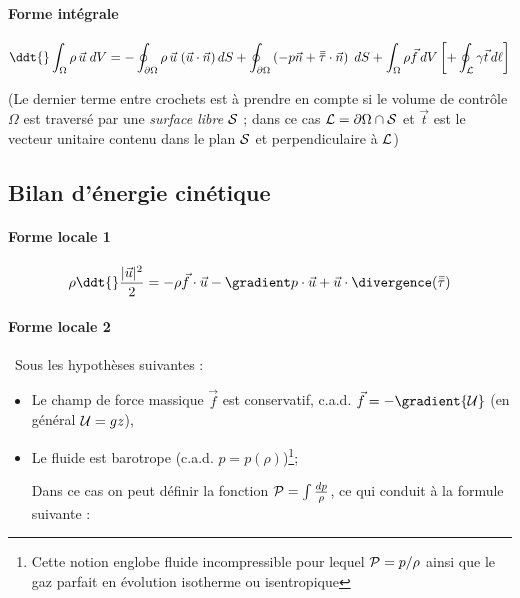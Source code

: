 \paragraph{Forme intégrale}
	\begin{equation}
		\ddt{} \int_{\Omega} \rho \, \vec{u} \; dV 
		=
		- \oint_{\partial \Omega} \rho \, \vec{u}\; (\vec{u}\cdot \vec{n}) \, dS
		+ \oint_{\partial \Omega} \left( -p \vec{n} + \mytensor{\tau} \cdot \vec{n}\right) \; dS
		+ \int_{\Omega} \rho \vec{f} \, dV 
		\left[ + \oint_{\cal L} \gamma \vec{t}  \, d\ell \right]
		\label{eq:bilan_global_eulerien_qdm}
	\end{equation}
	
{\small (Le dernier terme entre crochets est à prendre en compte si le volume de contrôle $\Omega$ est traversé par une {\em surface libre} ${\cal S}$ ; dans ce cas  $ {\cal L} = {\partial \Omega} \cap \cal S$ et $\vec t$ est le vecteur unitaire contenu dans le plan ${\cal S}$ et perpendiculaire à ${\cal L}$)}

\subsection{Bilan d'énergie cinétique}


\paragraph{Forme locale 1}
\begin{equation}
		\rho \ddt{} \frac{ |\vec{u}|^2}{2} 
		= 
		- \rho \vec{f} \cdot \vec{u}  - \gradient p \cdot {\vec u} + \vec{u} \cdot \divergence ( \mytensor{\tau} )
\end{equation}

\paragraph{Forme locale 2}

$\,$
Sous les hypothèses suivantes :
\begin{itemize}
\item 
Le champ de force massique $\vec f$ est conservatif, c.a.d. 
$\vec f = -\gradient {\cal U}$ (en général ${\cal U}= g z$),
\item  Le fluide est barotrope (c.a.d. $p=p(\rho)$)\footnote{Cette notion englobe fluide incompressible pour lequel ${\cal P} = p/ \rho$  ainsi que le gaz parfait en évolution isotherme ou isentropique};

Dans ce cas on peut définir la  fonction 
${\cal P} = \int \frac{d p}{\rho}$, ce qui conduit à la formule suivante :
\end{itemize}

